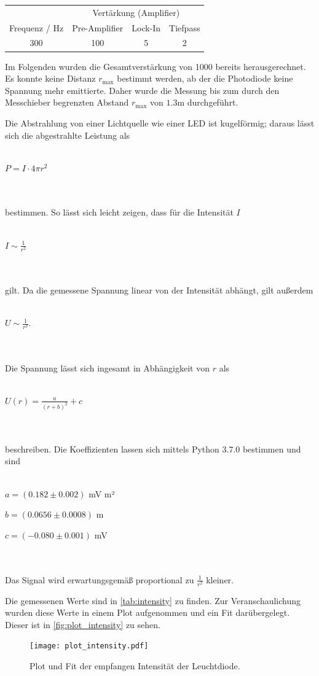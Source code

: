 \begin{table}[!htp]
  \centering
  \begin{tabular}{cccc}
    \toprule
     & \multicolumn{3}{c}{Vertärkung (Amplifier)} \\
    Frequenz / Hz & Pre-Amplifier & Lock-In & Tiefpass \\
    \midrule
    300 & 100 & 5 & 2 \\
    \bottomrule
  \end{tabular}
\end{table}

Im Folgenden wurden die Gesamtverstärkung von 1000 bereits herausgerechnet. Es konnte keine Distanz $r_\text{max}$ bestimmt werden, ab der die Photodiode keine Spannung mehr emittierte. Daher wurde die Messung bis zum durch den Messchieber begrenzten Abstand $r_\text{max}$ von $1.3$m durchgeführt.

Die Abstrahlung von einer Lichtquelle wie einer LED ist kugelförmig; daraus lässt sich die abgestrahlte Leistung als
\\ \\
\centerline{$P = I\cdot 4\pi r^2$}
\\ \\
bestimmen. So lässt sich leicht zeigen, dass für die Intensität $I$
\\ \\
\centerline{$I\sim \frac{1}{r^2}$}
\\ \\
gilt. Da die gemessene Spannung linear von der Intensität abhängt, gilt außerdem
\\ \\
\centerline{$U\sim \frac{1}{r^2}$.}
\\ \\
Die Spannung lässt sich ingesamt in Abhängigkeit von $r$ als
\\ \\
\centerline{$U(r) = \frac{a}{(r+b)^2} +c$}
\\ \\
beschreiben. Die Koeffizienten lassen sich mittels Python 3.7.0 bestimmen und sind
\\ \\
\centerline{$a=(0.182\pm 0.002)$ \!mV m²}
\centerline{$b=(0.0656\pm 0.0008)$ \!m}
\centerline{$c=(-0.080\pm 0.001)$ \!mV}
\\ \\
Das Signal wird erwartungsgemäß proportional zu $\frac{1}{r^2}$ kleiner.



Die gemessenen Werte sind in \autoref{tab:intensity} zu finden. Zur Veranschaulichung wurden diese Werte in einem Plot aufgenommen und ein Fit darübergelegt. Dieser ist in \autoref{fig:plot_intensity} zu sehen.


\begin{figure}
  \centering
  \texttt{[image: plot\_intensity.pdf]}
  \caption{Plot und Fit der empfangen Intensität der Leuchtdiode.}
  \label{fig:plot_intensity}
\end{figure}